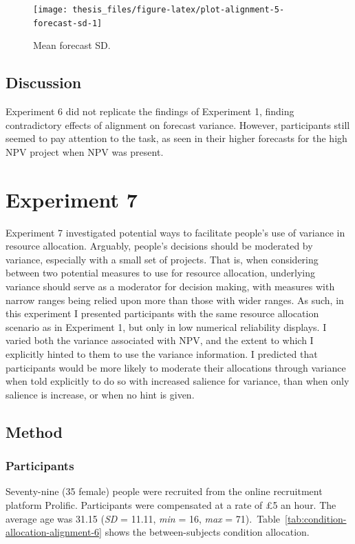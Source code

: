 \documentclass[a4paper, nobind, dvipsnames]{templates/ociamthesis}
\theoremstyle{definition}
\theoremstyle{definition}
\theoremstyle{definition}
\theoremstyle{definition}
\theoremstyle{remark}
\begin{document}
\begin{figure}
\texttt{[image: thesis\_files/figure-latex/plot-alignment-5-forecast-sd-1]} \caption{Mean forecast SD.}\label{fig:plot-alignment-5-forecast-sd}
\end{figure}

\subsection{Discussion}

Experiment 6 did not replicate the findings of Experiment 1, finding
contradictory effects of alignment on forecast variance. However, participants
still seemed to pay attention to the task, as seen in their higher forecasts for
the high NPV project when NPV was present.

\hypertarget{alignment-6}{%
\section{Experiment 7}\label{alignment-6}}

Experiment 7 investigated potential ways to facilitate people's use of variance
in resource allocation. Arguably, people's decisions should be moderated by
variance, especially with a small set of projects. That is, when considering
between two potential measures to use for resource allocation, underlying
variance should serve as a moderator for decision making, with measures with
narrow ranges being relied upon more than those with wider ranges. As such, in
this experiment I presented participants with the same resource allocation
scenario as in Experiment 1, but only in low numerical reliability displays. I
varied both the variance associated with NPV, and the extent to which I
explicitly hinted to them to use the variance information. I predicted that
participants would be more likely to moderate their allocations through variance
when told explicitly to do so with increased salience for variance, than when
only salience is increase, or when no hint is given.

\subsection{Method}

\subsubsection{Participants}

Seventy-nine (35 female) people were recruited from the online recruitment platform Prolific. Participants were compensated at a rate of £5 an hour. The average age was 31.15 (\emph{SD} = 11.11, \emph{min} = 16, \emph{max} = 71).~Table~\ref{tab:condition-allocation-alignment-6}
shows the between-subjects condition allocation.
\end{document}
